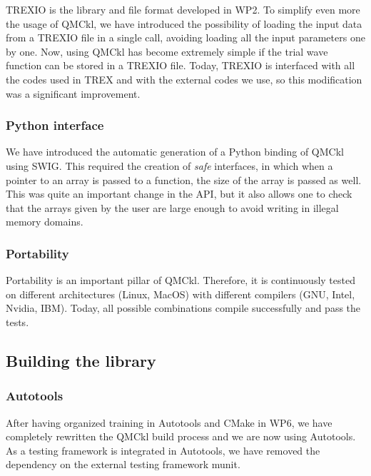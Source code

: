 TREXIO\cite{trexio} is the library and file format developed in \ac{WP}2.
To simplify even more the usage of QMCkl, we have introduced the
possibility of loading the input data from a TREXIO file in a single
call, avoiding loading all the input parameters one by one. Now, using
QMCkl has become extremely simple if the trial wave function can be
stored in a TREXIO file. Today, TREXIO is interfaced with all the
codes used in TREX and with the external codes we use, so this
modification was a significant improvement.

\subsubsection{Python interface}

We have introduced the automatic generation of a Python binding of
QMCkl using SWIG. This required the creation of \emph{safe} interfaces,
in which when a pointer to an array is passed to a function, the size
of the array is passed as well. This was quite an important change in
the API, but it also allows one to check that the arrays given by the user
are large enough to avoid writing in illegal memory domains.

\subsubsection{Portability}

Portability is an important pillar of QMCkl. Therefore, it is
continuously tested on different architectures (Linux, MacOS) with
different compilers (GNU, Intel, Nvidia, IBM). Today, all possible
combinations compile successfully and pass the tests.



\subsection{Building the library}

\subsubsection{Autotools}

After having organized training in Autotools\cite{Autotools} and CMake\cite{cmake} in WP6,
we have completely rewritten the QMCkl build process and we are now using
Autotools. As a testing framework is integrated in Autotools, we have
removed the dependency on the external testing framework munit.\cite{munit}

